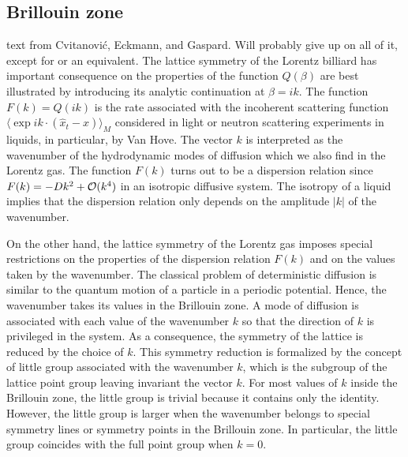         \ifboyscout
\subsection{Brillouin zone}

    {text from Cvitanovi\'c,  Eckmann, and Gaspard.
    Will probably give up on all of it, except for 
    or an equivalent.}
The lattice symmetry of the Lorentz billiard has important consequence on
the properties of the function $Q(\beta)$ are best illustrated by
introducing its analytic continuation at $\beta = i k$.  The function
$F(k)=Q(ik)$ is the rate associated with the incoherent scattering
function $\langle \exp i k \cdot (\hat x_t - x) \rangle_M$ considered in
light or neutron scattering experiments in liquids, in particular, by Van
Hove. The vector $k$ is interpreted as the
wavenumber of the hydrodynamic modes of diffusion which we also find in
the Lorentz gas.  The function $F(k)$ turns out to be a dispersion
relation since $F(k)=-D k^2 + {\cal O}(k^4)$ in an isotropic diffusive
system.  The isotropy of a liquid implies that the dispersion relation
only depends on the amplitude $\vert k\vert$ of the wavenumber.

On the other hand, the lattice symmetry of the Lorentz gas
imposes special restrictions on the properties of the dispersion relation
$F(k)$ and on the values taken by the wavenumber.  The classical
problem of deterministic diffusion is similar to the quantum motion of a particle in a
periodic potential.  Hence, the wavenumber takes its values in the
Brillouin zone.  A mode of diffusion is associated with each value of
the wavenumber $k$ so that the direction of $k$ is privileged in the
system.  As a consequence, the symmetry of the lattice is reduced by the choice
of $k$.  This symmetry reduction is formalized by the concept of little group
associated with the wavenumber $k$, which is the subgroup of the lattice point
group leaving invariant the vector $k$.  For most values of $k$ inside the
Brillouin zone, the little group is trivial because it contains only the
identity.  However, the little group is larger when the wavenumber belongs to
special symmetry lines or symmetry points in the Brillouin zone.  In particular,
the little group coincides with the full point group when $k=0$.

